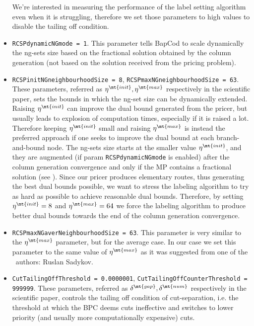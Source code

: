 \begin{itemize}
	      We're interested in measuring the performance of the label setting algorithm even when it is struggling, therefore we set those parameters to high values to disable the tailing off condition.
	\item \texttt{RCSPdynamicNGmode = 1}.
	      This parameter tells BapCod to scale dynamically
	      the ng-sets size based on the
	      fractional solution obtained by the column generation
	      (not based on the solution received from the pricing problem).
	\item \texttt{RCSPinitNGneighbourhoodSize = 8}, \texttt{RCSPmaxNGneighbourhoodSize = 63}.
	      These parameters, referred as $\eta^\mt{init}, \eta^\mt{max}$ respectively in the scientific paper,
	      sets the bounds in which the ng-set size can be dynamically extended.
	      Raising $\eta^\mt{init}$ can improve the dual bound generated from the pricer, but usually leads to explosion of computation times, especially if it is raised a lot.
	      Therefore keeping $\eta^\mt{init}$ small and raising $\eta^\mt{max}$ is instead the preferred approach if one seeks to improve the dual bound at each branch-and-bound node.
	      The ng-sets size starts at the smaller value $\eta^\mt{init}$, and they are augmented (if param \texttt{RCSPdynamicNGmode} is enabled)
	      after the column generation convergence and only if the MP contains a fractional solution (see \cite{pessoa2020a}).
	      Since our pricer produces elementary routes, thus generating the best dual bounds possible, we want to stress the labeling algorithm to try as hard as possible to achieve
	      reasonable dual bounds. Therefore, by setting $\eta^\mt{init} = 8$ and $\eta^\mt{max} = 64$ we force the labeling algorithm to produce better dual bounds towards the end
	      of the column generation convergence.
	\item \texttt{RCSPmaxNGaverNeighbourhoodSize = 63}.
	      This parameter is very similar to the $\eta^\mt{max}$ parameter, but for the average case.
	      In our case we set this parameter to the same value of $\eta^\mt{max}$ as it was suggested from one of the \bapcod\ authors: Ruslan Sadykov.
	\item \texttt{CutTailingOffThreshold = 0.0000001}, \texttt{CutTailingOffCounterThreshold = 999999}.
	      These parameters, referred as $\delta^\mt{gap}, \delta^\mt{num}$ respectively in the scientific paper,
	      controls the tailing off condition of cut-separation, i.e. the threshold
	      at which the BPC deems cuts ineffective and switches to lower priority
	      (and usually more computationally expensive) cuts.

\end{itemize}
